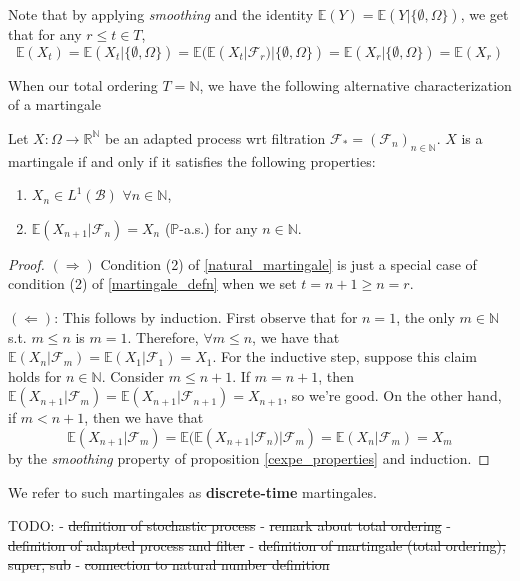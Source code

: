 Note that by applying \textit{smoothing} and the identity \(\mathbb{E}(Y) = \mathbb{E}(Y|\{\emptyset, \Omega\})\), we get that for any \(r \leq t \in T\), 
\[\mathbb{E}(X_{t}) = \mathbb{E}(X_{t} | \{\emptyset, \Omega\}) = \mathbb{E}(\mathbb{E}(X_{t} | \mathcal{F}_{r})|\{\emptyset, \Omega\}) = \mathbb{E}(X_{r}|\{\emptyset, \Omega\}) = \mathbb{E}(X_{r})\]

When our total ordering \(T = \mathbb{N}\), we have the following alternative characterization of a martingale
\begin{proposition}
    \label{natural_martingale}
    Let $X: \Omega \to \mathbb{R}^{\mathbb{N}}$ be an adapted process wrt filtration $\mathcal{F}_{*} = (\mathcal{F}_{n})_{n \in \mathbb{N}}$. $X$ is a martingale if and only if it satisfies the following properties:
    \begin{enumerate}
        \item $X_{n} \in L^{1}(\mathcal{B})$ $\forall n \in \mathbb{N}$,
        \item $\mathbb{E}(X_{n+1} | \mathcal{F}_{n}) = X_{n}$ (\(\mathbb{P}\)-a.s.) for any $n \in \mathbb{N}$.
    \end{enumerate}
\end{proposition}

\begin{proof}
    \((\Rightarrow)\) Condition (2) of \ref{natural_martingale} is just a special case of condition (2) of \ref{martingale_defn} when we set \(t = n+1 \geq n = r\).

    \((\Leftarrow)\): This follows by induction. First observe that for $n = 1$, the only $m \in \mathbb{N}$ s.t. $m \leq n$ is $m = 1$. Therefore, $\forall m \leq n$, we have that $\mathbb{E}(X_{n} | \mathcal{F}_{m}) = \mathbb{E}(X_{1} | \mathcal{F}_{1}) = X_{1}$. For the inductive step, suppose this claim holds for $n \in \mathbb{N}$. Consider $m \leq n+1$. If \(m = n+1\), then \(\mathbb{E}(X_{n+1} | \mathcal{F}_{m}) = \mathbb{E}(X_{n+1} | \mathcal{F}_{n+1}) = X_{n+1}\), so we're good. On the other hand, if \(m < n+1\), then we have that $$\mathbb{E}(X_{n+1} | \mathcal{F}_{m}) = \mathbb{E}(\mathbb{E}(X_{n+1} | \mathcal{F}_{n}) | \mathcal{F}_{m}) = \mathbb{E}(X_{n} | \mathcal{F}_{m}) = X_{m}$$ by the \textit{smoothing} property of proposition \ref{cexpe_properties} and induction.
\end{proof}

We refer to such martingales as \textbf{discrete-time} martingales.

TODO:
- \st{definition of stochastic process}
- \st{remark about total ordering}
- \st{definition of adapted process and filter}
- \st{definition of martingale (total ordering), super, sub}
- \st{connection to natural number definition}

